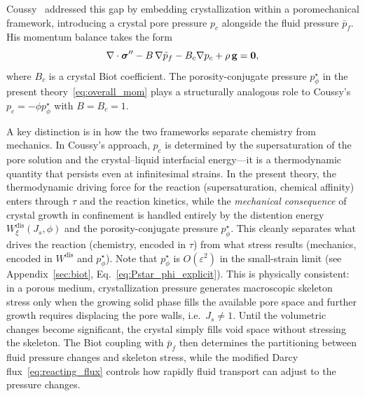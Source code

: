 \documentclass[11pt]{article}
\begin{document}
Coussy~\cite{coussy2006deformation} addressed this gap by embedding crystallization within a poromechanical framework, introducing a crystal pore pressure $p_c$ alongside the fluid pressure $\bar{p}_f$.  His momentum balance takes the form
%
\[
  \nabla \cdot \boldsymbol{\sigma}'' - B\,\nabla \bar{p}_f - B_c \nabla p_c + \rho\,\mathbf{g} = \mathbf{0},
\]
%
where $B_c$ is a crystal Biot coefficient.  The porosity-conjugate pressure $p^\star_\phi$ in the present theory~\eqref{eq:overall_mom} plays a structurally analogous role to Coussy's $p_c = -\phi p^\star_{\phi}$ with $B = B_c = 1$.

A key distinction is in how the two frameworks separate chemistry from mechanics.  In Coussy's approach, $p_c$ is determined by the supersaturation of the pore solution and the crystal--liquid interfacial energy---it is a thermodynamic quantity that persists even at infinitesimal strains.  In the present theory, the thermodynamic driving force for the reaction (supersaturation, chemical affinity) enters through $\tau$ and the reaction kinetics, while the \emph{mechanical consequence} of crystal growth in confinement is handled entirely by the distention energy $W^{\text{dis}}_\xi(J_s, \phi)$ and the porosity-conjugate pressure $p^\star_\phi$.  This cleanly separates what drives the reaction (chemistry, encoded in $\tau$) from what stress results (mechanics, encoded in $W^{\text{dis}}$ and $p^\star_\phi$).  Note that $p^\star_\phi$ is $O(\varepsilon^2)$ in the small-strain limit (see Appendix~\ref{sec:biot}, Eq.~\eqref{eq:Pstar_phi_explicit}).  This is physically consistent: in a porous medium, crystallization pressure generates macroscopic skeleton stress only when the growing solid phase fills the available pore space and further growth requires displacing the pore walls, i.e.\ $J_s \neq 1$.  Until the volumetric changes become significant, the crystal simply fills void space without stressing the skeleton.  The Biot coupling with $\bar{p}_f$ then determines the partitioning between fluid pressure changes and skeleton stress, while the modified Darcy flux~\eqref{eq:reacting_flux} controls how rapidly fluid transport can adjust to the pressure changes.
\end{document}
